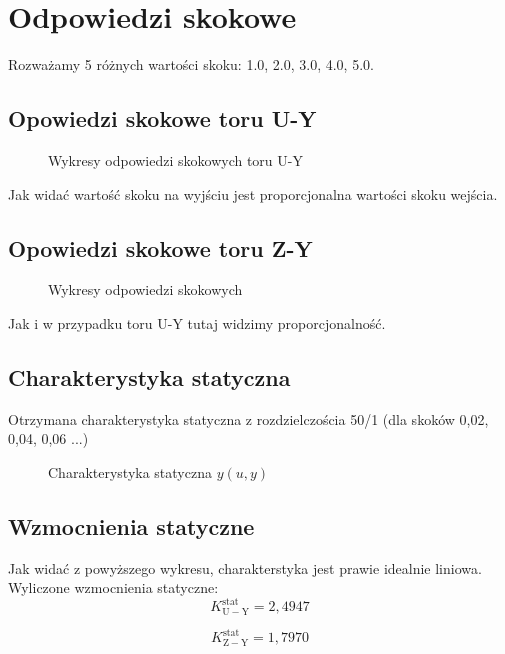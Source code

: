 \chapter{Odpowiedzi skokowe}

Rozważamy 5 różnych wartości skoku: \num{1.0}, \num{2.0}, \num{3.0}, \num{4.0}, \num{5.0}.

\section{Opowiedzi skokowe toru U-Y}

\begin{figure}[H]
\centering

\caption{Wykresy odpowiedzi skokowych toru U-Y}
\end{figure}

Jak widać wartość skoku na wyjściu jest proporcjonalna wartości skoku wejścia.

\section{Opowiedzi skokowe toru Z-Y}

\begin{figure}[H]
\centering

\caption{Wykresy odpowiedzi skokowych}
\end{figure}

Jak i w przypadku toru U-Y tutaj widzimy proporcjonalność.

\section{Charakterystyka statyczna}

Otrzymana charakterystyka statyczna z rozdzielczościa 50/1 (dla skoków 0,02, 0,04, 0,06 ...)


\begin{figure}[H]
\centering

\caption{Charakterystyka statyczna $y(u, y)$}
\end{figure}
    

\section{Wzmocnienia statyczne}
Jak widać z powyższego wykresu, charakterstyka jest prawie idealnie liniowa. Wyliczone wzmocnienia statyczne:
\begin{equation}
K^{\mathrm{stat}}_{\mathrm{U-Y}} = 2,4947
\end{equation}

\smallskip

\begin{equation}
K^{\mathrm{stat}}_{\mathrm{Z-Y}} = 1,7970
\end{equation}
